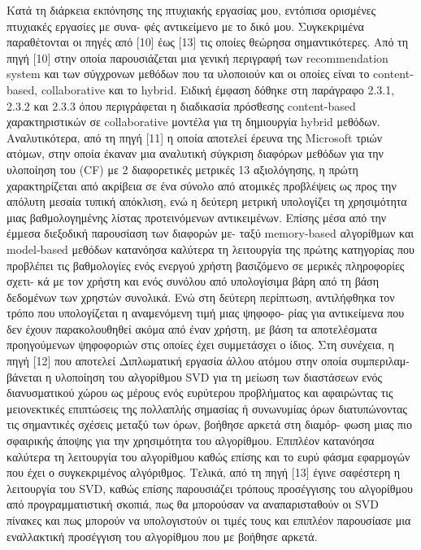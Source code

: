 \documentclass{report}
\begin{document}
Κατά τη διάρκεια εκπόνησης της πτυχιακής εργασίας μου, εντόπισα ορισμένες πτυχιακές εργασίες με συνα-
φές αντικείμενο με το δικό μου. Συγκεκριμένα παραθέτονται οι πηγές από [10] έως [13] τις οποίες θεώρησα
σημαντικότερες.
Από τη πηγή [10] στην οποία παρουσιάζεται μια γενική περιγραφή των \textlatin{recommendation system} και των
σύγχρονων μεθόδων που τα υλοποιούν και οι οποίες είναι το \textlatin{content-based}, \textlatin{collaborative} και το \textlatin{hybrid}.
Ειδική έμφαση δόθηκε στη παράγραφο 2.3.1, 2.3.2 και 2.3.3 όπου περιγράφεται η διαδικασία πρόσθεσης
content-based χαρακτηριστικών σε collaborative μοντέλα για τη δημιουργία hybrid μεθόδων.
Αναλυτικότερα, από τη πηγή [11] η οποία αποτελεί έρευνα της Microsoft τριών ατόμων, στην οποία
έκαναν μια αναλυτική σύγκριση διαφόρων μεθόδων για την υλοποίηση του \textlatin{(CF)} με 2 διαφορετικές μετρικές
13
αξιολόγησης, η πρώτη χαρακτηρίζεται από ακρίβεια σε ένα σύνολο από ατομικές προβλέψεις ως προς την
απόλυτη μεσαία τυπική απόκλιση, ενώ η δεύτερη μετρική υπολογίζει τη χρησιμότητα μιας βαθμολογημένης
λίστας προτεινόμενων αντικειμένων. Επίσης μέσα από την έμμεσα διεξοδική παρουσίαση των διαφορών με-
ταξύ memory-based αλγορίθμων και model-based μεθόδων κατανόησα καλύτερα τη λειτουργία της πρώτης
κατηγορίας που προβλέπει τις βαθμολογίες ενός ενεργού χρήστη βασιζόμενο σε μερικές πληροφορίες σχετι-
κά με τον χρήστη και ενός συνόλου από υπολογίσιμα βάρη από τη βάση δεδομένων των χρηστών συνολικά.
Ενώ στη δεύτερη περίπτωση, αντιλήφθηκα τον τρόπο που υπολογίζεται η αναμενόμενη τιμή μιας ψηφοφο-
ρίας για αντικείμενα που δεν έχουν παρακολουθηθεί ακόμα από έναν χρήστη, με βάση τα αποτελέσματα
προηγούμενων ψηφοφοριών στις οποίες έχει συμμετάσχει ο ίδιος.
Στη συνέχεια, η πηγή [12] που αποτελεί Διπλωματική εργασία άλλου ατόμου στην οποία συμπεριλαμ-
βάνεται η υλοποίηση του αλγορίθμου \textlatin{SVD} για τη μείωση των διαστάσεων ενός διανυσματικού χώρου ως
μέρους ενός ευρύτερου προβλήματος και αφαιρώντας τις μειονεκτικές επιπτώσεις της πολλαπλής σημασίας
ή συνωνυμίας όρων διατυπώνοντας τις σημαντικές σχέσεις μεταξύ των όρων, βοήθησε αρκετά στη διαμόρ-
φωση μιας πιο σφαιρικής άποψης για την χρησιμότητα του αλγορίθμου. Επιπλέον κατανόησα καλύτερα
τη λειτουργία του αλγορίθμου καθώς επίσης και το ευρύ φάσμα εφαρμογών που έχει ο συγκεκριμένος
αλγόριθμος.
Τελικά, από τη πηγή [13] έγινε σαφέστερη η λειτουργία του \textlatin{SVD}, καθώς επίσης παρουσιάζει τρόπους
προσέγγισης του αλγορίθμου από προγραμματιστική σκοπιά, πως θα μπορούσαν να αναπαρισταθούν οι
\textlatin{SVD} πίνακες και πως μπορούν να υπολογιστούν οι τιμές τους και επιπλέον παρουσίασε μια εναλλακτική
προσέγγιση του αλγορίθμου που με βοήθησε αρκετά.
\end{document}
